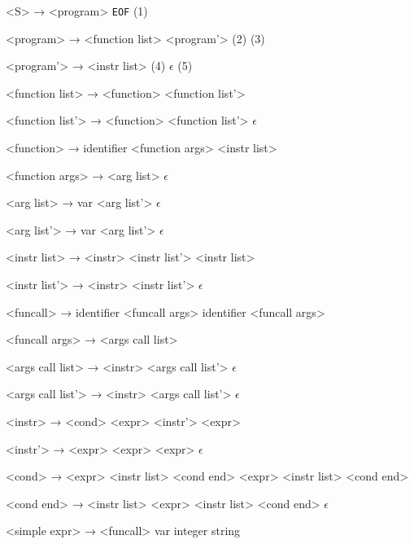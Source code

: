 ﻿<S>              → <program> \texttt{EOF} (1)

<program>        → <function list> <program'> (2)
                  (3)

<program'>       → <instr list> (4)
                 \alt $\epsilon$ (5)

<function list>  → <function> <function list'>
                 
<function list'> → <function> <function list'>
		 \alt $\epsilon$

<function>       →  identifier <function args> \lit{\{} <instr list> \lit{\}}

<function args>  → \lit{(} <arg list> \lit{)}
                 \alt $\epsilon$

<arg list>       → var <arg list'>
                 \alt $\epsilon$

<arg list'>      → \lit{,} var <arg list'>
                 \alt $\epsilon$

<instr list>     → <instr> \lit{;} <instr list'>
                 \alt \lit{\{} <instr list> \lit{\}}

<instr list'>    → <instr> \lit{;} <instr list'>
                 \alt $\epsilon$

<funcall>        → \lit{\&} identifier <funcall args>
                 \alt identifier <funcall args>

<funcall args>   → \lit{(} <args call list> \lit{)}

<args call list> → <instr> <args call list'>
                 \alt $\epsilon$

<args call list'> → \lit{,} <instr> <args call list'>
                  \alt $\epsilon$

<instr>          → <cond>
                 \alt <expr> <instr'> 
                 \alt {} <expr>

<instr'>         → \lit{=} <expr>
                 \alt {} <expr>
                 \alt {} <expr>
                 \alt $\epsilon$

<cond>           →  <expr> \lit{\{} <instr list> \lit{\}} <cond end>
                 \alt {} <expr> \lit{\{} <instr list> \lit{\}} <cond end>

<cond end>       →  \lit{\{} <instr list> \lit{\}}
                 \alt {} <expr> \lit{\{} <instr list> \lit{\}} <cond end>
                 \alt $\epsilon$

<simple expr>    → <funcall>
                 \alt var
                 \alt integer
                 \alt string


